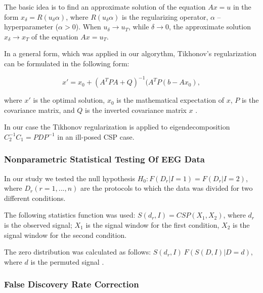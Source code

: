 \documentclass[14pt,a4paper]{scrartcl}
\begin{document}
The basic idea is to find an approximate solution of the equation $Ax = u$ in the form $x_{\delta} = R(u_{\delta}\alpha)$, where $R(u_{\delta}\alpha)$ is the regularizing operator, $\alpha$ – hyperparameter ($\alpha > 0$). When $u_{\delta} \rightarrow u_{T}$, while $\delta \rightarrow 0$, the approximate solution $x_{\delta} \rightarrow x_{T}$ of the equation $Ax = u_{T}$.

In a general form, which was applied in our algorythm, Tikhonov's regularization can be formulated in the following form: 

\begin{equation}
x' = x_0 + (A^{T}PA + Q)^{-1}(A^{T}P(b-Ax_{0}),
\end{equation}

where $x'$ is the optimal solution, $x_0$ is the mathematical expectation of $x$, $P$ is the covariance matrix, and $Q$ is the inverted covariance matrix $x$ \cite{Tikhonov1963}.

In our case the Tikhonov regularization is applied to eigendecomposition $C^{-1}_{2}C_{1} = PDP^{-1}$ in an ill-posed CSP case.



\subsubsection{Nonparametric Statistical Testing Of EEG Data}
\label{sec:Methods:Data Analysis:Nonparametric Statistical Testing Of EEG Data}

In our study we tested the null hypothesis $H_0: F(D_r| I=1) =  F(D_r|I=2)$, where $D_r (r = 1, . . . , n)$ are the protocols to which the data was divided for two different conditions. 

The following statistics function was used: $S(d_r, I) = CSP(X_1, X_2)$, where $d_r$ is the observed signal; $X_1$ is the signal window for the first condition, $X_2$ is the signal window for the second condition.

The zero distribution was calculated as follows: $S(d_r, I) ~ F(S(D, I)|{D} = {d})$, where ${d}$ is the permuted signal \cite{Maris2007}. 

\subsubsection{False Discovery Rate Correction}
\label{sec:Methods:Data Analysis:False Discovery Rate Correction}
\end{document}
